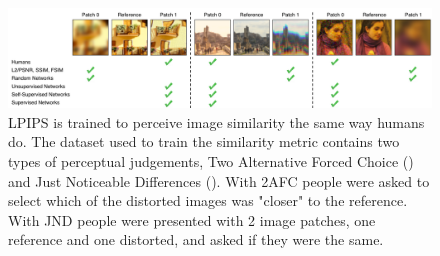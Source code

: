 \begin{figure}[h]
    \label{fig:lpips}
    \centering
    \includegraphics[width=1.0\textwidth]{figures/LPIPS.png}
    \caption{LPIPS is trained to perceive image similarity the same way humans do. The dataset used to train the similarity metric contains two types of perceptual judgements, Two Alternative Forced Choice () and Just Noticeable Differences (). With 2AFC people were asked to select which of the distorted images was "closer" to the reference. With JND people were presented with 2 image patches, one reference and one distorted, and asked if they were the same.}
    \label{fig:my_label}
\end{figure}